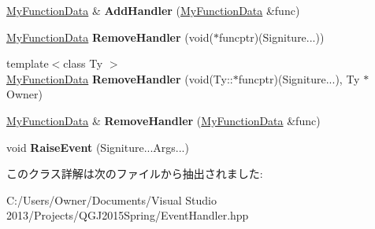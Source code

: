 \begin{DoxyCompactItemize}
\item 
\hyperlink{class_function}{My\+Function\+Data} \& {\bfseries Add\+Handler} (\hyperlink{class_function}{My\+Function\+Data} \&func)\hypertarget{class_event_handler_3_01void_07_signiture_8_8_8_08_4_a0120179fbbd96e5ccf5159836292d990}{}\label{class_event_handler_3_01void_07_signiture_8_8_8_08_4_a0120179fbbd96e5ccf5159836292d990}

\item 
\hyperlink{class_function}{My\+Function\+Data} {\bfseries Remove\+Handler} (void($\ast$funcptr)(Signiture...))\hypertarget{class_event_handler_3_01void_07_signiture_8_8_8_08_4_a23f8967b4388bc34026a66c31ef1db75}{}\label{class_event_handler_3_01void_07_signiture_8_8_8_08_4_a23f8967b4388bc34026a66c31ef1db75}

\item 
{\footnotesize template$<$class Ty $>$ }\\\hyperlink{class_function}{My\+Function\+Data} {\bfseries Remove\+Handler} (void(Ty\+::$\ast$funcptr)(Signiture...), Ty $\ast$Owner)\hypertarget{class_event_handler_3_01void_07_signiture_8_8_8_08_4_a34cd349d644a3edca35544ff653dbe17}{}\label{class_event_handler_3_01void_07_signiture_8_8_8_08_4_a34cd349d644a3edca35544ff653dbe17}

\item 
\hyperlink{class_function}{My\+Function\+Data} \& {\bfseries Remove\+Handler} (\hyperlink{class_function}{My\+Function\+Data} \&func)\hypertarget{class_event_handler_3_01void_07_signiture_8_8_8_08_4_a72787ee79f9c31eb7519e1b4a421f0f6}{}\label{class_event_handler_3_01void_07_signiture_8_8_8_08_4_a72787ee79f9c31eb7519e1b4a421f0f6}

\item 
void {\bfseries Raise\+Event} (Signiture...\+Args...)\hypertarget{class_event_handler_3_01void_07_signiture_8_8_8_08_4_ae5e8f4adb2d26ecc4799e6a43944ddce}{}\label{class_event_handler_3_01void_07_signiture_8_8_8_08_4_ae5e8f4adb2d26ecc4799e6a43944ddce}

\end{DoxyCompactItemize}


このクラス詳解は次のファイルから抽出されました\+:\begin{DoxyCompactItemize}
\item 
C\+:/\+Users/\+Owner/\+Documents/\+Visual Studio 2013/\+Projects/\+Q\+G\+J2015\+Spring/Event\+Handler.\+hpp\end{DoxyCompactItemize}
